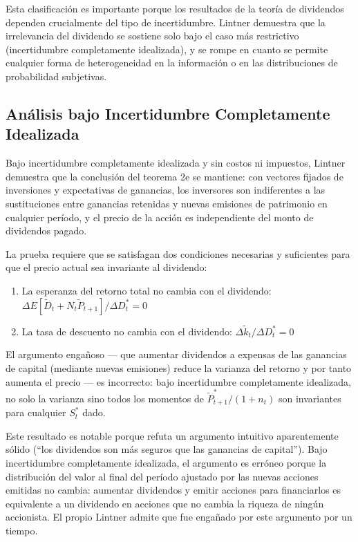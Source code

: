 \documentclass[12pt]{article}
\begin{document}
\begin{intuicion}
Esta clasificaci\'on es importante porque los resultados de la teor\'ia de dividendos dependen crucialmente del tipo de incertidumbre. Lintner demuestra que la irrelevancia del dividendo se sostiene solo bajo el caso m\'as restrictivo (incertidumbre completamente idealizada), y se rompe en cuanto se permite cualquier forma de heterogeneidad en la informaci\'on o en las distribuciones de probabilidad subjetivas.
\end{intuicion}

\subsection{An\'alisis bajo Incertidumbre Completamente Idealizada}

Bajo incertidumbre completamente idealizada y sin costos ni impuestos, Lintner demuestra que la conclusi\'on del teorema 2e se mantiene: con vectores fijados de inversiones y expectativas de ganancias, los inversores son indiferentes a las sustituciones entre ganancias retenidas y nuevas emisiones de patrimonio en cualquier per\'iodo, y el precio de la acci\'on es independiente del monto de dividendos pagado.

La prueba requiere que se satisfagan dos condiciones necesarias y suficientes para que el precio actual sea invariante al dividendo:

\begin{enumerate}
  \item La esperanza del retorno total no cambia con el dividendo: $\Delta E[\tilde{D}_t + N_t \tilde{P}_{t+1}] / \Delta D^*_t = 0$
  \item La tasa de descuento no cambia con el dividendo: $\Delta \tilde{k}_t / \Delta D^*_t = 0$
\end{enumerate}

El argumento engañoso --- que aumentar dividendos a expensas de las ganancias de capital (mediante nuevas emisiones) reduce la varianza del retorno y por tanto aumenta el precio --- es incorrecto: bajo incertidumbre completamente idealizada, no solo la varianza sino todos los momentos de $\tilde{P}^*_{t+1}/(1+n_t)$ son invariantes para cualquier $S^*_t$ dado.

\begin{explicacion}
Este resultado es notable porque refuta un argumento intuitivo aparentemente s\'olido (``los dividendos son m\'as seguros que las ganancias de capital''). Bajo incertidumbre completamente idealizada, el argumento es err\'oneo porque la distribuci\'on del valor al final del per\'iodo ajustado por las nuevas acciones emitidas no cambia: aumentar dividendos y emitir acciones para financiarlos es equivalente a un dividendo en acciones que no cambia la riqueza de ning\'un accionista. El propio Lintner admite que fue enga\~nado por este argumento por un tiempo.
\end{explicacion}
\end{document}
